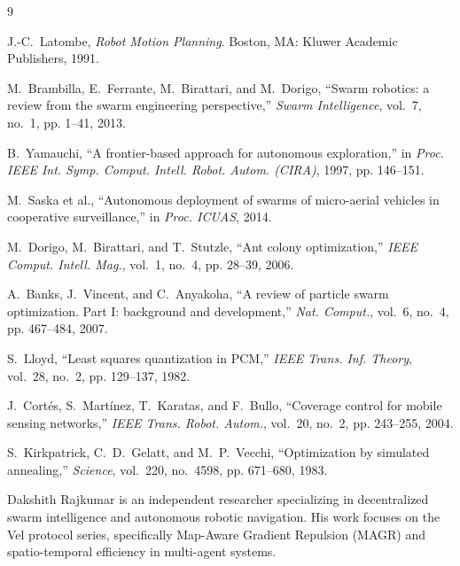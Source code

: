 \documentclass[10pt,journal]{IEEEtran}
\begin{document}
\begin{thebibliography}{9}

J.-C.~Latombe, \emph{Robot Motion Planning}. Boston, MA: Kluwer Academic Publishers, 1991.

M.~Brambilla, E.~Ferrante, M.~Birattari, and M.~Dorigo, ``Swarm robotics: a review from the swarm engineering perspective,'' \emph{Swarm Intelligence}, vol.~7, no.~1, pp. 1--41, 2013.

B.~Yamauchi, ``A frontier-based approach for autonomous exploration,'' in \emph{Proc. IEEE Int. Symp. Comput. Intell. Robot. Autom. (CIRA)}, 1997, pp. 146--151.

M.~Saska et al., ``Autonomous deployment of swarms of micro-aerial vehicles in cooperative surveillance,'' in \emph{Proc. ICUAS}, 2014.

M.~Dorigo, M.~Birattari, and T.~Stutzle, ``Ant colony optimization,'' \emph{IEEE Comput. Intell. Mag.}, vol.~1, no.~4, pp. 28--39, 2006.

A.~Banks, J.~Vincent, and C.~Anyakoha, ``A review of particle swarm optimization. Part I: background and development,'' \emph{Nat. Comput.}, vol.~6, no.~4, pp. 467--484, 2007.

S.~Lloyd, ``Least squares quantization in {PCM},'' \emph{IEEE Trans. Inf. Theory}, vol.~28, no.~2, pp. 129--137, 1982.

J.~Cortés, S.~Martínez, T.~Karatas, and F.~Bullo, ``Coverage control for mobile sensing networks,'' \emph{IEEE Trans. Robot. Autom.}, vol.~20, no.~2, pp. 243--255, 2004.

S.~Kirkpatrick, C.~D.~Gelatt, and M.~P.~Vecchi, ``Optimization by simulated annealing,'' \emph{Science}, vol.~220, no.~4598, pp. 671--680, 1983.

\end{thebibliography}

\begin{IEEEbiographynophoto}{Dakshith Rajkumar}
is an independent researcher specializing in decentralized swarm
intelligence and autonomous robotic navigation. His work focuses on the
Vel protocol series, specifically Map-Aware Gradient Repulsion (MAGR) and
spatio-temporal efficiency in multi-agent systems.
\end{IEEEbiographynophoto}
\end{document}
